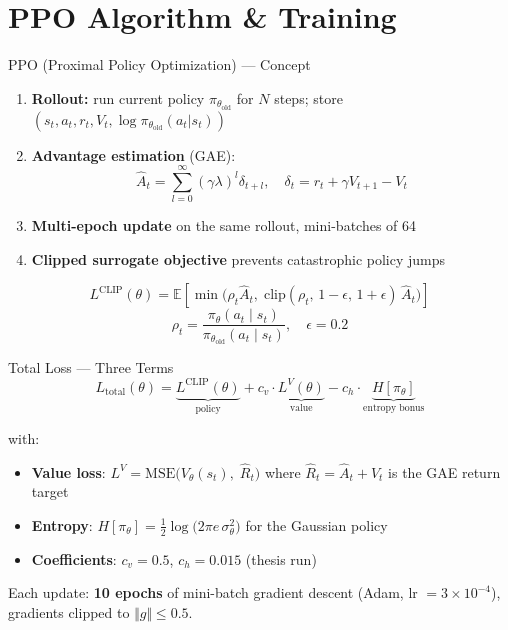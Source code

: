 \documentclass[10pt,aspectratio=169]{beamer}
\begin{document}
\section{PPO Algorithm \& Training}

\begin{frame}{PPO (Proximal Policy Optimization) --- Concept}
  \begin{enumerate}
    \item \textbf{Rollout:} run current policy $\pi_{\theta_{\text{old}}}$ for $N$ steps; store
          $(s_t, a_t, r_t, V_t, \log\pi_{\theta_{\text{old}}}(a_t|s_t))$
    \item \textbf{Advantage estimation} (GAE): %
          \[\hat A_t = \sum_{l=0}^{\infty}(\gamma\lambda)^l \delta_{t+l},\quad
            \delta_t = r_t + \gamma V_{t+1} - V_t\]
    \item \textbf{Multi-epoch update} on the same rollout, mini-batches of 64
    \item \textbf{Clipped surrogate objective} prevents catastrophic policy jumps
  \end{enumerate}
  \vspace{0.5em}
  \[
    L^{\text{CLIP}}(\theta) = \mathbb{E}\!\left[\min\!\Big(
        \rho_t \hat A_t,\; \mathrm{clip}(\rho_t,\, 1-\epsilon,\, 1+\epsilon)\,\hat A_t
      \Big)\right]
  \]
  \[
    \rho_t = \frac{\pi_\theta(a_t \mid s_t)}{\pi_{\theta_{\text{old}}}(a_t \mid s_t)},
    \quad \epsilon = 0.2
  \]
\end{frame}

\begin{frame}{Total Loss --- Three Terms}
  \[
    L_{\text{total}}(\theta) = \underbrace{L^{\text{CLIP}}(\theta)}_{\text{policy}}
                              + c_v \cdot \underbrace{L^{V}(\theta)}_{\text{value}}
                              - c_h \cdot \underbrace{H[\pi_\theta]}_{\text{entropy bonus}}
  \]

  \vspace{0.5em}
  with:
  \begin{itemize}
    \item \textbf{Value loss}: $L^V = \mathrm{MSE}\big(V_\theta(s_t),\; \hat R_t\big)$
          where $\hat R_t = \hat A_t + V_t$ is the GAE return target
    \item \textbf{Entropy}: $H[\pi_\theta] = \frac{1}{2}\log\!\big(2\pi e \,\sigma_\theta^2\big)$ for the Gaussian policy
    \item \textbf{Coefficients}: $c_v = 0.5$, $c_h = 0.015$ (thesis run)
  \end{itemize}

  \vspace{0.5em}
  Each update: \textbf{10 epochs} of mini-batch gradient descent (Adam, lr $= 3\!\times\!10^{-4}$),
  gradients clipped to $\Vert g \Vert \leq 0.5$.
\end{frame}
\end{document}
